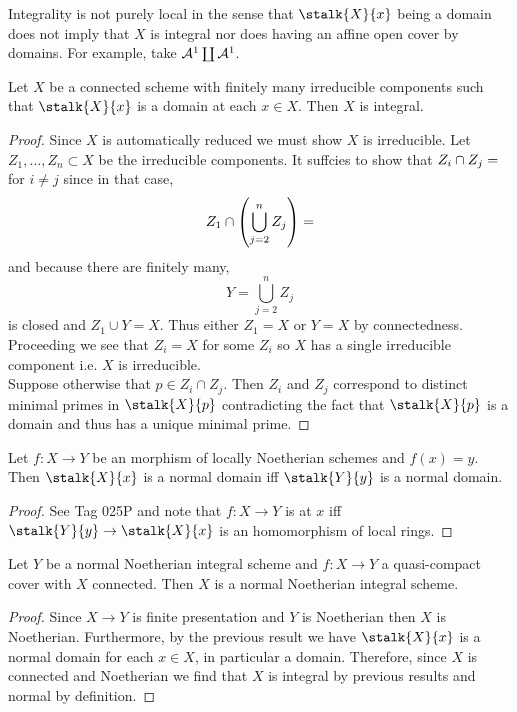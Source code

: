\documentclass[12pt]{article}
\begin{document}
\begin{rmk}
Integrality is not purely local in the sense that $\stalk{X}{x}$ being a domain does not imply that $X$ is integral nor does having an affine open cover by domains. For example, take $\mathcal{A}^1 \coprod \mathcal{A}^1$.
\end{rmk}

\begin{lemma}
Let $X$ be a connected scheme with finitely many irreducible components such that $\stalk{X}{x}$ is a domain at each $x \in X$. Then $X$ is integral.
\end{lemma}

\begin{proof}
Since $X$ is automatically reduced we must show $X$ is irreducible. Let $Z_1, \dots, Z_n \subset X$ be the irreducible components. It suffcies to show that $Z_i \cap Z_j = \empty$ for $i \neq j$ since in that case,
\[ Z_1 \cap \left( \bigcup_{j = 2}^n Z_j \right) = \empty \]
and because there are finitely many,
\[ Y = \bigcup_{j = 2}^n Z_j \]
is closed and $Z_1 \cup Y = X$. Thus either $Z_1 = X$ or $Y = X$ by connectedness. Proceeding we see that $Z_i = X$ for some $Z_i$ so $X$ has a single irreducible component i.e. $X$ is irreducible. 
\bigskip\\
Suppose otherwise that $p \in Z_i \cap Z_j$. Then $Z_i$ and $Z_j$ correspond to distinct minimal primes in $\stalk{X}{p}$ contradicting the fact that $\stalk{X}{p}$ is a domain and thus has a unique minimal prime. 
\end{proof}

\begin{lemma}
Let $f : X \to Y$ be an \etale morphism of locally Noetherian schemes and $f(x) = y$. Then $\stalk{X}{x}$ is a normal domain iff $\stalk{Y}{y}$ is a normal domain.
\end{lemma}

\begin{proof}
See Tag 025P and note that $f : X \to Y$ is \etale at $x$ iff $\stalk{Y}{y} \to \stalk{X}{x}$ is an \etale homomorphism of local rings.
\end{proof}

\begin{prop}
Let $Y$ be a normal Noetherian integral scheme and $f : X \to Y$ a quasi-compact \etale cover with $X$ connected. Then $X$ is a normal Noetherian integral scheme.
\end{prop}

\begin{proof}
Since $X \to Y$ is finite presentation and $Y$ is Noetherian then $X$ is Noetherian. Furthermore, by the previous result we have $\stalk{X}{x}$ is a normal domain for each $x \in X$, in particular a domain. Therefore, since $X$ is connected and Noetherian we find that $X$ is integral by previous results and normal by definition. 
\end{proof}
\end{document}
